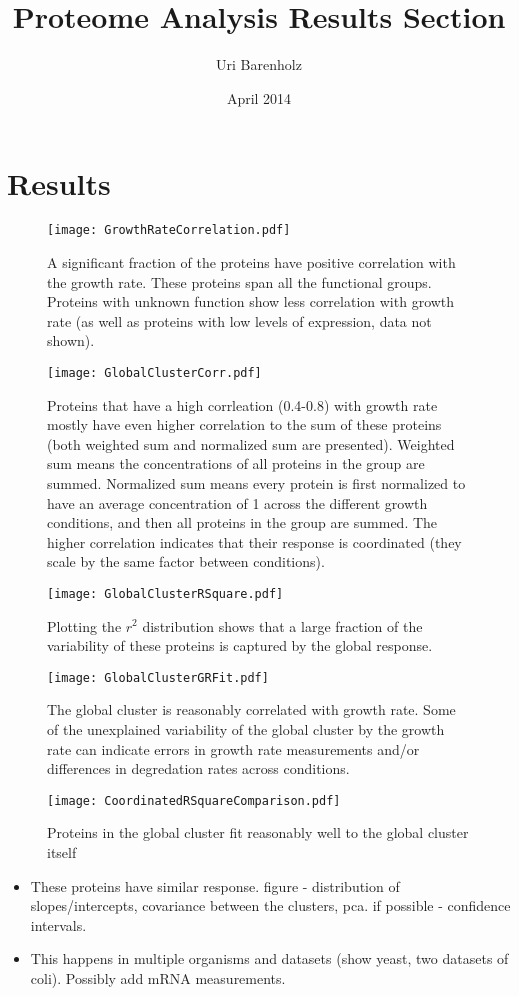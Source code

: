\documentclass[a4page,notitlepage]{article}
\title{Proteome Analysis Results Section}
\author{Uri Barenholz}
\date{April 2014}
\begin{document}
\maketitle
\section{Results}

\begin{figure}[h]
\centering
\texttt{[image: GrowthRateCorrelation.pdf]}
\caption{
A significant fraction of the proteins have positive correlation with the growth rate.
These proteins span all the functional groups.
Proteins with unknown function show less correlation with growth rate (as well as proteins with low levels of expression, data not shown).
}
\label{growth-corr}
\end{figure}

\begin{figure}[h]
\centering
\texttt{[image: GlobalClusterCorr.pdf]}
\caption{
Proteins that have a high corrleation (0.4-0.8) with growth rate mostly have even higher correlation to the sum of these proteins (both weighted sum and normalized sum are presented).
Weighted sum means the concentrations of all proteins in the group are summed.
Normalized sum means every protein is first normalized to have an average concentration of 1 across the different growth conditions, and then all proteins in the group are summed.
The higher correlation indicates that their response is coordinated (they scale by the same factor between conditions).
}
\label{global-corr}
\end{figure}

\begin{figure}[h]
\centering
\texttt{[image: GlobalClusterRSquare.pdf]}
\caption{
Plotting the $r^2$ distribution shows that a large fraction of the variability of these proteins is captured by the global response.
}
\label{global-rsq}
\end{figure}

\begin{figure}[h]
\centering
\texttt{[image: GlobalClusterGRFit.pdf]}
\caption{
The global cluster is reasonably correlated with growth rate.
Some of the unexplained variability of the global cluster by the growth rate can indicate errors in growth rate measurements and/or differences in degredation rates across conditions.
}
\label{global-grcorr}
\end{figure}

\begin{figure}[h]
\centering
\texttt{[image: CoordinatedRSquareComparison.pdf]}
\caption{
  Proteins in the global cluster fit reasonably well to the global cluster itself
}
\label{global-fit}
\end{figure}
\begin{itemize}
 
\item These proteins have similar response.
figure - distribution of slopes/intercepts, covariance between the clusters, pca. if possible - confidence intervals.
\item This happens in multiple organisms and datasets (show yeast, two datasets of coli). Possibly add mRNA measurements.
\end{itemize}
\end{document}
